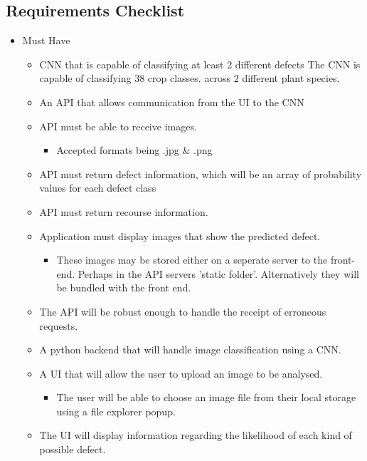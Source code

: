   \subsection{Requirements Checklist}
    \begin{itemize}
      \item Must Have
      \begin{itemize}
        \item CNN that is capable of classifying at least 2 different defects \checkmark The CNN is capable of classifying 38 crop classes.
          across 2 different plant species.
        \item An API that allows communication from the UI to the CNN \checkmark
        \item API must be able to receive images. \checkmark
          \begin{itemize}
            \item Accepted formats being .jpg \& .png
          \end{itemize}
        \item API must return defect information, which will be an array of probability values for each defect class \checkmark
        \item API must return recourse information. \checkmark
        \item Application must display images that show the predicted defect. \checkmark
          \begin{itemize}
            \item These images may be stored either on a seperate server to the front-end. Perhaps in the API servers 'static folder'. Alternatively they will be bundled with the front end.
          \end{itemize}
      	\item The API will be robust enough to handle the receipt of erroneous requests. \checkmark
      	\item A python backend that will handle image classification using a CNN. \checkmark
      	\item A UI that will allow the user to upload an image to be analysed. \checkmark
        \begin{itemize}
          \item The user will be able to choose an image file from their local storage using a file explorer popup.
        \end{itemize}
      	\item The UI will display information regarding the likelihood of each kind of possible defect. \checkmark

\end{itemize}
\end{itemize}
